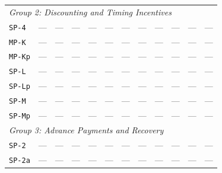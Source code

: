 \documentclass[12pt, a4paper]{article}
\begin{document}
\begin{longtable}{lccccccccccc}
\multicolumn{12}{l}{\small\textit{Group 2: Discounting and Timing Incentives}} \\
\texttt{SP-4} & {\color{gray}---} & {\color{gray}---} & {\color{gray}---} & {\color{gray}---} & {\color{gray}---} & {\color{gray}---} & {\color{gray}---} & {\color{gray}---} & {\color{gray}---} & {\color{gray}---} & {\color{gray}---} \\
\texttt{MP-K} & {\color{gray}---} & {\color{gray}---} & {\color{gray}---} & {\color{gray}---} & {\color{gray}---} & {\color{gray}---} & {\color{gray}---} & {\color{gray}---} & {\color{gray}---} & {\color{gray}---} & {\color{gray}---} \\
\texttt{MP-Kp} & {\color{gray}---} & {\color{gray}---} & {\color{gray}---} & {\color{gray}---} & {\color{gray}---} & {\color{gray}---} & {\color{gray}---} & {\color{gray}---} & {\color{gray}---} & {\color{gray}---} & {\color{gray}---} \\
\texttt{SP-L} & {\color{gray}---} & {\color{gray}---} & {\color{gray}---} & {\color{gray}---} & {\color{gray}---} & {\color{gray}---} & {\color{gray}---} & {\color{gray}---} & {\color{gray}---} & {\color{gray}---} & {\color{gray}---} \\
\texttt{SP-Lp} & {\color{gray}---} & {\color{gray}---} & {\color{gray}---} & {\color{gray}---} & {\color{gray}---} & {\color{gray}---} & {\color{gray}---} & {\color{gray}---} & {\color{gray}---} & {\color{gray}---} & {\color{gray}---} \\
\texttt{SP-M} & {\color{gray}---} & {\color{gray}---} & {\color{gray}---} & {\color{gray}---} & {\color{gray}---} & {\color{gray}---} & {\color{gray}---} & {\color{gray}---} & {\color{gray}---} & {\color{gray}---} & {\color{gray}---} \\
\texttt{SP-Mp} & {\color{gray}---} & {\color{gray}---} & {\color{gray}---} & {\color{gray}---} & {\color{gray}---} & {\color{gray}---} & {\color{gray}---} & {\color{gray}---} & {\color{gray}---} & {\color{gray}---} & {\color{gray}---} \\
\multicolumn{12}{l}{\small\textit{Group 3: Advance Payments and Recovery}} \\
\texttt{SP-2} & {\color{gray}---} & {\color{gray}---} & {\color{gray}---} & {\color{gray}---} & {\color{gray}---} & {\color{gray}---} & {\color{gray}---} & {\color{gray}---} & {\color{gray}---} & {\color{gray}---} & {\color{gray}---} \\
\texttt{SP-2a} & {\color{gray}---} & {\color{gray}---} & {\color{gray}---} & {\color{gray}---} & {\color{gray}---} & {\color{gray}---} & {\color{gray}---} & {\color{gray}---} & {\color{gray}---} & {\color{gray}---} & {\color{gray}---} \\

\end{longtable}
\end{document}
